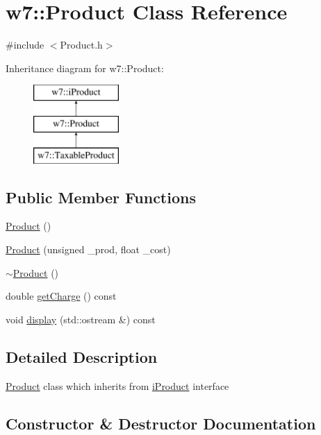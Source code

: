 \hypertarget{classw7_1_1Product}{}\section{w7\+:\+:Product Class Reference}
\label{classw7_1_1Product}


{\ttfamily \#include $<$Product.\+h$>$}

Inheritance diagram for w7\+:\+:Product\+:\begin{figure}[H]
\begin{center}
\leavevmode
\includegraphics[height=3.000000cm]{classw7_1_1Product}
\end{center}
\end{figure}
\subsection*{Public Member Functions}
\begin{DoxyCompactItemize}
\item 
\mbox{\hyperlink{classw7_1_1Product_a716e2427e981bfd738f6c9c49d0c3ced}{Product}} ()
\item 
\mbox{\hyperlink{classw7_1_1Product_aa5d91c860fae799ab80865c41508fd59}{Product}} (unsigned \+\_\+prod, float \+\_\+cost)
\item 
\mbox{\hyperlink{classw7_1_1Product_adeb7d71bf940bb585977fe07a772190b}{$\sim$\+Product}} ()
\item 
double \mbox{\hyperlink{classw7_1_1Product_a6d73613659451d1492541ef3d0d016b7}{get\+Charge}} () const
\item 
void \mbox{\hyperlink{classw7_1_1Product_a60b146f19a712d3eadd1b93a48c54e7d}{display}} (std\+::ostream \&) const
\end{DoxyCompactItemize}


\subsection{Detailed Description}
\mbox{\hyperlink{classw7_1_1Product}{Product}} class which inherits from \mbox{\hyperlink{classw7_1_1iProduct}{i\+Product}} interface 

\subsection{Constructor \& Destructor Documentation}
\mbox{\label{classw7_1_1Product_a716e2427e981bfd738f6c9c49d0c3ced}} 
